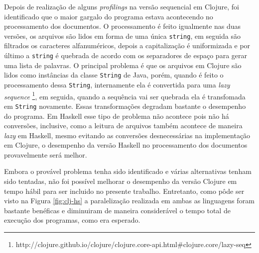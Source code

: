 Depois de realização de alguns \emph{profilings} na versão sequencial em Clojure, foi identificado que o maior gargalo do programa estava acontecendo no processamento dos documentos. O processamento é feito igualmente nas duas versões, os arquivos são lidos em forma de uma única \verb|string|, em seguida são filtrados os caracteres alfanuméricos, depois a capitalização é uniformizada e por último a \verb|string| é quebrada de acordo com os separadores de espaço para gerar uma lista de palavras. O principal problema é que os arquivos em Clojure são lidos como instâncias da classe \verb|String| de Java, porém, quando é feito o processamento dessa \verb|String|, internamente ela é convertida para uma \emph{lazy sequence} \footnote{http://clojure.github.io/clojure/clojure.core-api.html\#clojure.core/lazy-seq}, em seguida, quando a sequência vai ser quebrada ela é transfomada em \verb|String| novamente. Essas transformações degradam bastante o desempenho do programa. Em Haskell esse tipo de problema não acontece pois não há conversões, inclusive, como a leitura de arquivos também acontece de maneira \emph{lazy} em Haskell, mesmo evitando as conversões desnecessárias na implementação em Clojure, o desempenho da versão Haskell no processamento dos documentos provavelmente será melhor.

Embora o provável problema tenha sido identificado e várias alternativas tenham sido tentadas, não foi possível melhorar o desempenho da versão Clojure em tempo hábil para ser incluido no presente trabalho. Entretanto, como pôde ser visto na Figura \ref{fig:clj-hs} a paralelização realizada em ambas as linguagens foram bastante benéficas e diminuiram de maneira considerável o tempo total de execução dos programas, como era esperado.